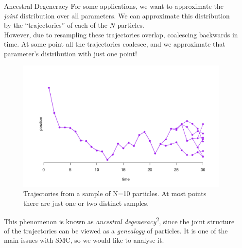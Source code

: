 \documentclass[final, 12pt]{beamer}
\newlength{\colwidth}
\begin{document}
\begin{frame}
\begin{columns}
\begin{column}{\colwidth}
\begin{block}{Ancestral Degeneracy}
For some applications, we want to approximate the \emph{joint} distribution over all parameters.
We can approximate this distribution by the ``trajectories'' of each of the $N$ particles.\\[16pt]

However, due to resampling these trajectories overlap, coalescing backwards in time. At some point all the trajectories coalesce, and we approximate that parameter's distribution with just one point!

\begin{figure} %
\includegraphics[width=\colwidth , trim={1.5cm 0.5cm 0.5cm 1.5cm},clip]{../degen2.pdf}
\caption{Trajectories from a sample of N=10 particles. At most points there are just one or two distinct samples.}
\end{figure}

This phenomenon is known as \emph{ancestral degeneracy}\textsuperscript{2}, since the joint structure of the trajectories can be viewed as a \emph{genealogy} of particles. It is one of the main issues with SMC, so we would like to analyse it.
\end{block}
\end{column}

\begin{column}{\colwidth}
\vspace*{5pt}


\end{column}
\end{columns}
\end{frame}
\end{document}
